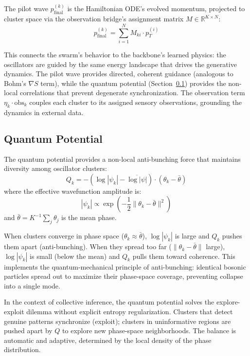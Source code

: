 \documentclass[11pt,a4paper,twocolumn]{article}
\begin{document}
The pilot wave $p_{\mathrm{final}}^{(k)}$ is the Hamiltonian ODE's evolved momentum, projected to cluster space via the observation bridge's assignment matrix $M \in \mathbb{R}^{K \times N}$:
\begin{equation}
p_{\mathrm{final}}^{(k)} = \sum_{i=1}^{N} M_{ki} \cdot p_T^{(i)}
\label{eq:pilot_projection}
\end{equation}

This connects the swarm's behavior to the backbone's learned physics: the oscillators are guided by the same energy landscape that drives the generative dynamics.
The pilot wave provides directed, coherent guidance (analogous to Bohm's $\nabla S$ term), while the quantum potential (Section~\ref{sec:quantum_potential}) provides the non-local correlations that prevent degenerate synchronization.
The observation term $\eta_k \cdot \mathrm{obs}_k$ couples each cluster to its assigned sensory observations, grounding the dynamics in external data.

\subsection{Quantum Potential}
\label{sec:quantum_potential}

The quantum potential provides a non-local anti-bunching force that maintains diversity among oscillator clusters:
\begin{equation}
Q_k = -\left(\log|\psi_k| - \overline{\log|\psi|}\right) \cdot (\theta_k - \bar{\theta})
\label{eq:quantum_potential}
\end{equation}
where the effective wavefunction amplitude is:
\begin{equation}
|\psi_k| \propto \exp\!\left(-\frac{1}{2}\|\theta_k - \bar{\theta}\|^2\right)
\label{eq:psi_amplitude}
\end{equation}
and $\bar{\theta} = K^{-1}\sum_j \theta_j$ is the mean phase.

When clusters converge in phase space ($\theta_k \approx \bar{\theta}$), $\log|\psi_k|$ is large and $Q_k$ pushes them apart (anti-bunching).
When they spread too far ($\|\theta_k - \bar{\theta}\|$ large), $\log|\psi_k|$ is small (below the mean) and $Q_k$ pulls them toward coherence.
This implements the quantum-mechanical principle of anti-bunching: identical bosonic particles spread out to maximize their phase-space coverage, preventing collapse into a single mode.

In the context of collective inference, the quantum potential solves the explore-exploit dilemma without explicit entropy regularization.
Clusters that detect genuine patterns synchronize (exploit); clusters in uninformative regions are pushed apart by $Q$ to explore new phase-space neighborhoods.
The balance is automatic and adaptive, determined by the local density of the phase distribution.
\end{document}
